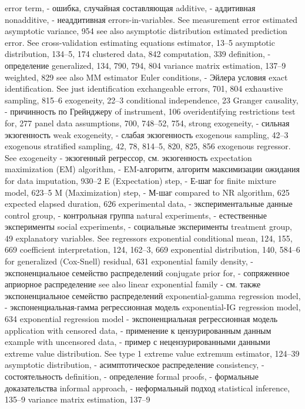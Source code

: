 error term, - ошибка, случайная составляющая
additive, - аддитивная
nonadditive, - неаддитивная
errors-in-variables. See measurement error estimated asymptotic variance, 954
see also asymptotic distribution
estimated prediction error. See cross-validation estimating equations estimator, 13–5
asymptotic distribution, 134–5, 174 clustered data, 842
computation, 339
definition, - определение
generalized, 134, 790, 794, 804 variance matrix estimation, 137–9 weighted, 829
see also MM estimator
Euler conditions, - Эйлера условия
exact identification. See just identification exchangeable errors, 701, 804
exhaustive sampling, 815–6
exogeneity, 22–3
conditional independence, 23
Granger causality, - причинность по Грейнджеру
of instrument, 106
overidentifying restrictions test for, 277 panel data assumptions, 700, 748–52, 754,
strong exogeneity, - сильная экзогенность
weak exogeneity, - слабая экзогенность
exogenous sampling, 42–3
exogenous stratified sampling, 42, 78, 814–5, 820,
825, 856
exogenous regressor. See exogeneity - экзогенный регрессор, см. экзогенность
expectation maximization (EM) algorithm, - EM-алгоритм, алгоритм максимизации ожидания
for data imputation, 930–2
E (Expectation) step, - Е-шаг
for finite mixture model, 623–5 
M (Maximization) step, - М-шаг
compared to NR algorithm, 625
expected elapsed duration, 626 
experimental data, - экспериментальные данные
control group, - контрольная группа
natural experiments, - естественные эксперименты 
social experiments, - социальные эксперименты 
treatment group, 49
explanatory variables. See regressors exponential conditional mean, 124, 155, 669 
coefficient interpretation, 124, 162–3, 669
exponential distribution, 140, 584–6
for generalized (Cox-Snell) residual, 631
exponential family density, - экспоненциальное семейство распределений 
conjugate prior for, - сопряженное априорное распределение
see also linear exponential family - см. также экспоненциальное семейство распределений
exponential-gamma regression model, - экспоненциальная-гамма регрессионная модель
exponential-IG regression model, 634 
exponential regression model - экспоненциальная регрессионная модель
application with censored data, - применение к цензурированным данным
example with uncensored data, - пример с нецензурированными данными
extreme value distribution. See type 1 extreme value extremum estimator, 124–39
asymptotic distribution, - асимптотическое распределение 
consistency, - состоятельность
definition, - определение
formal proofs, - формальные доказательства
informal approach, - неформальный подход 
statistical inference, 135–9 variance matrix estimation, 137–9
